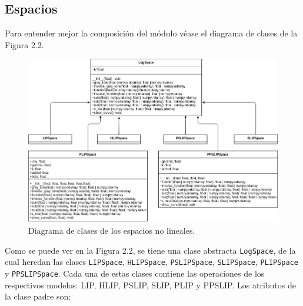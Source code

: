 \subsection{Espacios}

Para entender mejor la composici\'on del m\'odulo v\'ease el diagrama de clases de la Figura 2.2.

\begin{figure}[h]
	\begin{center}
		\includegraphics[width=16.0 cm]{images/spaces_class_diagram.png}
		\caption{Diagrama de clases de los espacios no lineales.}
	\end{center}
\end{figure}

Como se puede ver en la Figura 2.2, se tiene una clase abstracta \verb|LogSpace|, de la cual heredan las clases \verb|LIPSpace|, \verb|HLIPSpace|, \verb|PSLIPSpace|, \verb|SLIPSpace|, \verb|PLIPSpace| y \verb|PPSLIPSpace|. Cada una de estas clases contiene las operaciones de los respectivos modelos: LIP, HLIP, PSLIP, SLIP, PLIP y PPSLIP. Los atributos de la clase padre son:

